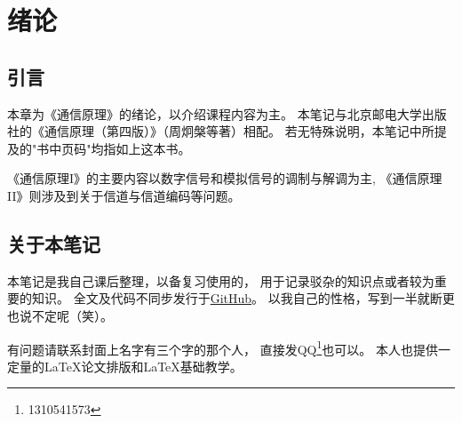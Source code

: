 \section{绪论}
\subsection{引言}
    本章为《通信原理》的绪论，以介绍课程内容为主。
    本笔记与北京邮电大学出版社的《通信原理（第四版）》（周炯槃等著）相配。
    若无特殊说明，本笔记中所提及的"书中页码"均指如上这本书。

    《通信原理I》的主要内容以数字信号和模拟信号的调制与解调为主,
    《通信原理II》则涉及到关于信道与信道编码等问题。

\subsection{关于本笔记}
    本笔记是我自己课后整理，以备复习使用的，
    用于记录驳杂的知识点或者较为重要的知识。
    全文及代码不同步发行于\href{https://github.com/phydx0803/BuptPoCNoteBook/}{GitHub}。
    以我自己的性格，写到一半就断更也说不定呢（笑）。

    有问题请联系封面上名字有三个字的那个人，
    直接发QQ\footnote{1310541573}也可以。
    本人也提供一定量的\textcolor{bupt}{\LaTeX{}}论文排版和\textcolor{bupt}{\LaTeX{}}基础教学。

    
